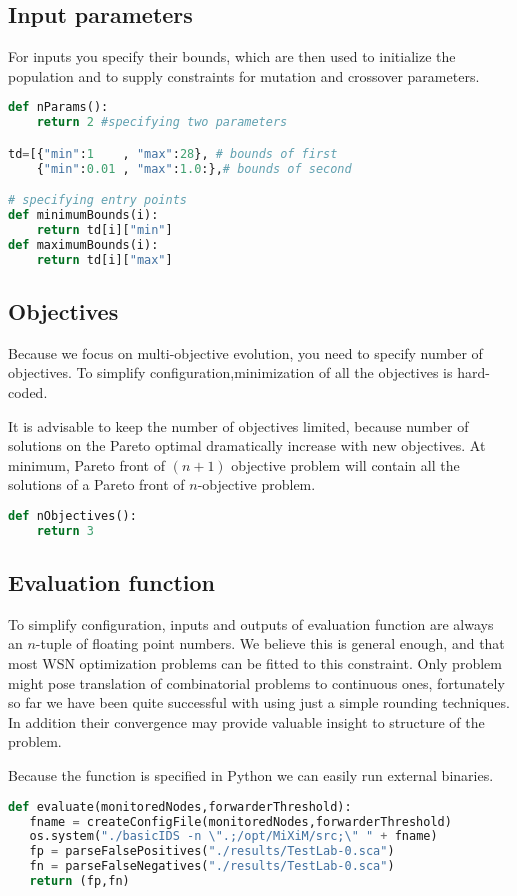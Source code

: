 \documentclass[12pt,oneside]{fithesis2}
\begin{document}
\subsection{Input parameters}
For inputs you specify their bounds, which are then used to initialize the population and to supply constraints for mutation and crossover parameters.
\begin{lstlisting}[language=Python,label=inp_example,caption=Inputs]
def nParams():
	return 2 #specifying two parameters

td=[{"min":1    , "max":28}, # bounds of first 
    {"min":0.01 , "max":1.0:},# bounds of second

# specifying entry points
def minimumBounds(i):
	return td[i]["min"] 
def maximumBounds(i):
	return td[i]["max"]
\end{lstlisting}

\subsection{Objectives}
Because we focus on multi-objective evolution, you need to specify number of objectives. To simplify configuration,minimization of all the objectives is hard-coded.

It is advisable to keep the number of objectives limited, because number of solutions on the Pareto optimal dramatically increase with new objectives. At minimum, Pareto front of $(n+1)$ objective problem will contain all the solutions of a Pareto front of $n$-objective problem. \cite{talbi2009metaheuristics}
\begin{lstlisting}[language=Python,label=obj_example,caption=Objectives]
def nObjectives():
	return 3
\end{lstlisting}
\subsection{Evaluation function}

To simplify configuration, inputs and outputs of evaluation function are always an $n$-tuple of floating point numbers. We believe this is general enough, and that most WSN optimization problems can be fitted to this constraint. Only problem might pose translation of combinatorial problems to continuous ones, fortunately so far we have been quite successful with using just a simple rounding techniques. In addition their convergence may provide valuable insight to structure of the problem.

Because the function is specified in Python we can easily run external binaries.
\begin{lstlisting}[language=Python,label=obj_example,caption=Evaluation]
def evaluate(monitoredNodes,forwarderThreshold):
   fname = createConfigFile(monitoredNodes,forwarderThreshold)
   os.system("./basicIDS -n \".;/opt/MiXiM/src;\" " + fname)
   fp = parseFalsePositives("./results/TestLab-0.sca")
   fn = parseFalseNegatives("./results/TestLab-0.sca")
   return (fp,fn)
\end{lstlisting}
\end{document}
